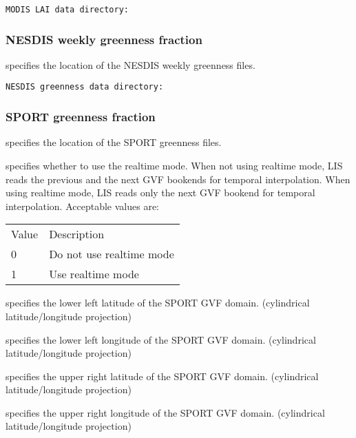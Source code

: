  \begin{Verbatim}[frame=single]
MODIS LAI data directory:
 \end{Verbatim}

 
 \subsubsection{NESDIS weekly greenness fraction}
 \label{sssec:nesdisgreenness}
 

 
  specifies the location of
 the NESDIS weekly greenness files.
 

 \begin{Verbatim}[frame=single]
NESDIS greenness data directory:
 \end{Verbatim}

 
 \subsubsection{SPORT greenness fraction}
 \label{sssec:sportgreenness}
 

 
  specifies the location of
 the SPORT greenness files.

  specifies whether to use the
 realtime mode.  When not using realtime mode, LIS reads the
 previous and the next GVF bookends for temporal interpolation.
 When using realtime mode, LIS reads only the next GVF bookend
 for temporal interpolation.
 Acceptable values are:

 \begin{tabular}{ll}
 Value & Description              \\
 0     & Do not use realtime mode \\
 1     & Use realtime mode        \\
 \end{tabular}

  specifies the lower left latitude
 of the SPORT GVF domain.
 (cylindrical latitude/longitude projection)

  specifies the lower left
 longitude of the SPORT GVF domain.
 (cylindrical latitude/longitude projection)

  specifies the upper right latitude
 of the SPORT GVF domain.
 (cylindrical latitude/longitude projection)

  specifies the upper right
 longitude of the SPORT GVF domain.
 (cylindrical latitude/longitude projection)

